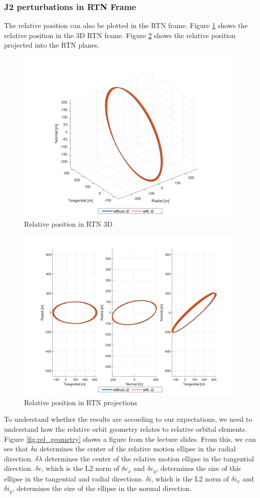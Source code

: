 \subsubsection{J2 perturbations in RTN Frame}\label{sec:J2_RTN_frame}
The relative position can also be plotted in the RTN frame. Figure \ref{fig:RTN_3D} shows the relative position in the 3D RTN frame. Figure \ref{fig:RTN_projections} shows the relative position projected into the RTN planes.

\begin{figure}[H]
    \centering
    \includegraphics[width=0.75\linewidth]{sim/figures/PS4/RTN_3D_SV2.png}
    \caption{Relative position in RTN 3D}
    \label{fig:RTN_3D}
\end{figure}

\begin{figure}[H]
    \centering
    \includegraphics[width=0.75\linewidth]{sim/figures/PS4/RTN_projections_SV2.png}
    \caption{Relative position in RTN projections}
    \label{fig:RTN_projections}
\end{figure}

To understand whether the results are according to our expectations, we need to understand how the relative orbit geometry relates to relative orbital elements. Figure \ref{fig:rel_geometry} shows a figure from the lecture slides. From this, we can see that $\delta a$ determines the center of the relative motion ellipse in the radial direction. $\delta \lambda$ determines the center of the relative motion ellipse in the tangential direction. $\delta e$, which is the L2 norm of $\delta e_x$ and $\delta e_y$, determines the size of this ellipse in the tangential and radial directions. $\delta i$, which is the L2 norm of $\delta i_x$ and $\delta i_y$, determines the size of the ellipse in the normal direction. 

